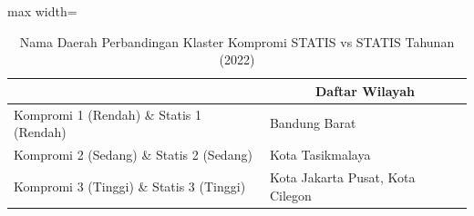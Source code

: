 \begin{table}[H]
\centering
\caption{Nama Daerah Perbandingan Klaster Kompromi STATIS vs STATIS Tahunan (2022)} \label{tab:sample2comp_statis_name_2022}
\begin{adjustbox}{max width=\textwidth}
\begin{tabular}{|>{\centering\arraybackslash}p{4cm}|p{10cm}|}
\hline
\multicolumn{1}{|c|}{\textbf{Kategori}} & \multicolumn{1}{c|}{\textbf{Daftar Wilayah}} \\
\hline
Kompromi 1 (Rendah) \& Statis 1 (Rendah) & Bandung Barat \\
\hline
Kompromi 2 (Sedang) \& Statis 2 (Sedang) & Kota Tasikmalaya \\
\hline
Kompromi 3 (Tinggi) \& Statis 3 (Tinggi) & Kota Jakarta Pusat, Kota Cilegon \\
\hline
\end{tabular}
\end{adjustbox}
\end{table}